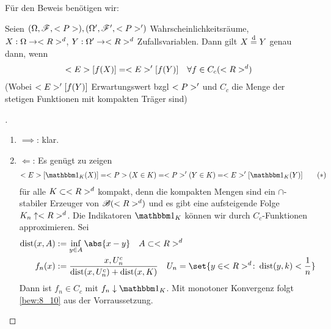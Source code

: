 Für den Beweis benötigen wir:
\begin{lemma}
	 Seien $(\O,\F,\P),(\O', \F',\P')$ Wahrscheinlichkeitsräume, $X: \O \to \Rd$, $Y: \O' \to \Rd$ Zufallsvariablen. Dann gilt $X \distri Y$ genau dann, wenn
	\begin{align*}
		\E[f(X)] = \E'[f(Y)] \quad \forall f \in C_c (\Rd)
	\end{align*} 
	(Wobei $\E'[f(Y)]$ Erwartungswert bzgl $\P'$ und $C_c$ die Menge der stetigen Funktionen mit kompakten Träger sind)
\end{lemma}
\begin{proof}[]
	\begin{enumerate}
		\item $\implies$: klar.
		\item $\Longleftarrow$: Es genügt zu zeigen
		\begin{align*}
			\E[\indi_K(X)] = \P(X \in K) = \P'(Y \in K) = \E'[\indi_K(Y)] \label{bew:8_10}\tag{$\ast$}
		\end{align*}
		für alle $K \subset \Rd$ kompakt, denn die kompakten Mengen sind ein $\cap$-stabiler Erzeuger von $\borel(\Rd)$ und es gibt eine aufsteigende Folge $K_n \uparrow \Rd$. Die Indikatoren $\indi_K$ können wir durch $C_c$-Funktionen approximieren. Sei
		\begin{align*}
			\dist(x,A) &:= \inf_{y \in A}\abs{x-y} \quad A \subset \Rd\\
			f_n(x) &:= \frac{x, U_n^c}{\dist(x,U_n^c)+ \dist(x,K)} \quad U_n = \set{y \in \Rd\colon \dist(y,k) < \frac{1}{n}}
		\end{align*}
		Dann ist $f_n \in C_c$ mit $f_n \downarrow \indi_K$. Mit monotoner Konvergenz folgt \eqref{bew:8_10} aus der Vorraussetzung.
	\end{enumerate}
\end{proof}
